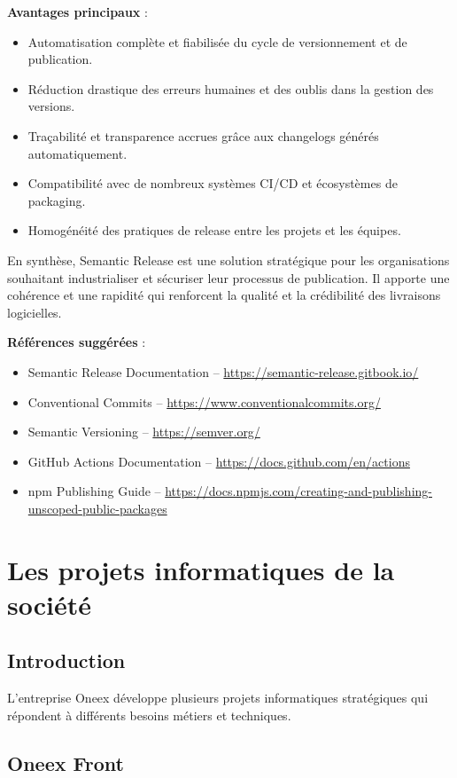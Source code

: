 \textbf{Avantages principaux} :
\begin{itemize}
	\item Automatisation complète et fiabilisée du cycle de versionnement et de publication.
	\item Réduction drastique des erreurs humaines et des oublis dans la gestion des versions.
	\item Traçabilité et transparence accrues grâce aux changelogs générés automatiquement.
	\item Compatibilité avec de nombreux systèmes CI/CD et écosystèmes de packaging.
	\item Homogénéité des pratiques de release entre les projets et les équipes.
\end{itemize}

En synthèse, Semantic Release est une solution stratégique pour les organisations souhaitant industrialiser et sécuriser leur processus de publication. Il apporte une cohérence et une rapidité qui renforcent la qualité et la crédibilité des livraisons logicielles.

\textbf{Références suggérées} :
\begin{itemize}
	\item Semantic Release Documentation – \url{https://semantic-release.gitbook.io/}
	\item Conventional Commits – \url{https://www.conventionalcommits.org/}
	\item Semantic Versioning – \url{https://semver.org/}
	\item GitHub Actions Documentation – \url{https://docs.github.com/en/actions}
	\item npm Publishing Guide – \url{https://docs.npmjs.com/creating-and-publishing-unscoped-public-packages}
\end{itemize}


\section{Les projets informatiques de la société}

\subsection{Introduction}

L’entreprise Oneex développe plusieurs projets informatiques stratégiques qui répondent à différents besoins métiers et techniques.

\subsection{Oneex Front}

